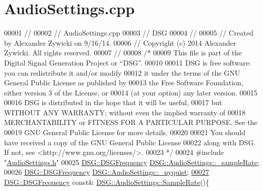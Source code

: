 \hypertarget{_audio_settings_8cpp_source}{\section{Audio\+Settings.\+cpp}
\label{_audio_settings_8cpp_source}
}

\begin{DoxyCode}
00001 \textcolor{comment}{//}
00002 \textcolor{comment}{//  AudioSettings.cpp}
00003 \textcolor{comment}{//  DSG}
00004 \textcolor{comment}{//}
00005 \textcolor{comment}{//  Created by Alexander Zywicki on 9/16/14.}
00006 \textcolor{comment}{//  Copyright (c) 2014 Alexander Zywicki. All rights reserved.}
00007 \textcolor{comment}{//}
00008 \textcolor{comment}{/*}
00009 \textcolor{comment}{ This file is part of the Digital Signal Generation Project or “DSG”.}
00010 \textcolor{comment}{}
00011 \textcolor{comment}{ DSG is free software: you can redistribute it and/or modify}
00012 \textcolor{comment}{ it under the terms of the GNU General Public License as published by}
00013 \textcolor{comment}{ the Free Software Foundation, either version 3 of the License, or}
00014 \textcolor{comment}{ (at your option) any later version.}
00015 \textcolor{comment}{}
00016 \textcolor{comment}{ DSG is distributed in the hope that it will be useful,}
00017 \textcolor{comment}{ but WITHOUT ANY WARRANTY; without even the implied warranty of}
00018 \textcolor{comment}{ MERCHANTABILITY or FITNESS FOR A PARTICULAR PURPOSE.  See the}
00019 \textcolor{comment}{ GNU General Public License for more details.}
00020 \textcolor{comment}{}
00021 \textcolor{comment}{ You should have received a copy of the GNU General Public License}
00022 \textcolor{comment}{ along with DSG.  If not, see <http://www.gnu.org/licenses/>.}
00023 \textcolor{comment}{ */}
00024 \textcolor{preprocessor}{#include "\hyperlink{_audio_settings_8h}{AudioSettings.h}"}
00025 \hyperlink{namespace_d_s_g_a4315a061386fa1014fda09b15d3a6973}{DSG::DSGFrequency} \hyperlink{class_d_s_g_1_1_audio_settings_a56869b51933f102b197f54001c8a1d27}{DSG::AudioSettings::\_sampleRate};
00026 \hyperlink{namespace_d_s_g_a4315a061386fa1014fda09b15d3a6973}{DSG::DSGFrequency} \hyperlink{class_d_s_g_1_1_audio_settings_af3c7cbd15390d9bcbe39983c069390b5}{DSG::AudioSettings::\_nyquist};
\hypertarget{_audio_settings_8cpp_source_l00027}{}\hyperlink{class_d_s_g_1_1_audio_settings_a4f459c389b10c11828e2f2f00c012c49}{00027} \hyperlink{namespace_d_s_g_a4315a061386fa1014fda09b15d3a6973}{DSG::DSGFrequency} \textcolor{keyword}{const}& \hyperlink{class_d_s_g_1_1_audio_settings_a4f459c389b10c11828e2f2f00c012c49}{DSG::AudioSettings::SampleRate}()\{

\end{DoxyCode}
